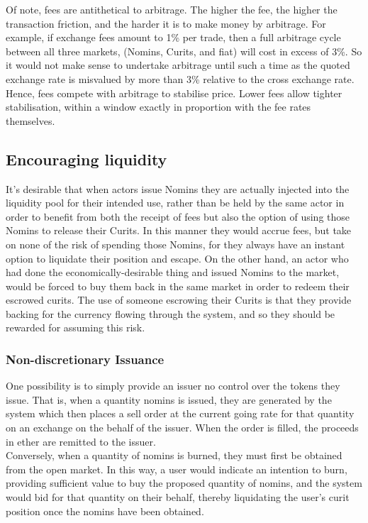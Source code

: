 \noindent Of note, fees are antithetical to arbitrage. The higher the fee, the higher the transaction friction, and the harder it is to make money by arbitrage. For example, if exchange fees amount to 1\% per trade, then a full arbitrage cycle between all three markets, (Nomins, Curits, and fiat) will cost in excess of 3\%. So it would not make sense to undertake arbitrage until such a time as the quoted exchange rate is misvalued by more than 3\% relative to the cross exchange rate. Hence, fees compete with arbitrage to stabilise price. Lower fees allow tighter stabilisation, within a window exactly in proportion with the fee rates themselves.

\subsection{Encouraging liquidity}

\noindent It's desirable that when actors issue Nomins they are actually injected into the liquidity pool for their intended use, rather than be held by the same actor in order to benefit from both the receipt of fees but also the option of using those Nomins to release their Curits. In this manner they would accrue fees, but take on none of the risk of spending those Nomins, for they always have an instant option to liquidate their position and escape. On the other hand, an actor who had done the economically-desirable thing and issued Nomins to the market, would be forced to buy them back in the same market in order to redeem their escrowed curits. The use of someone escrowing their Curits is that they provide backing for the currency flowing through the system, and so they should be rewarded for assuming this risk.

\subsubsection{Non-discretionary Issuance}

One possibility is to simply provide an issuer no control over the tokens they issue. That is, when a quantity nomins is issued, they are generated by the system which then places a sell order at the current going rate for that quantity on an exchange on the behalf of the issuer. When the order is filled, the proceeds in ether are remitted to the issuer. \\

\noindent Conversely, when a quantity of nomins is burned, they must first be obtained from the open market. In this way, a user would indicate an intention to burn, providing sufficient value to buy the proposed quantity of nomins, and the system would bid for that quantity on their behalf, thereby liquidating the user's curit position once the nomins have been obtained. \\

